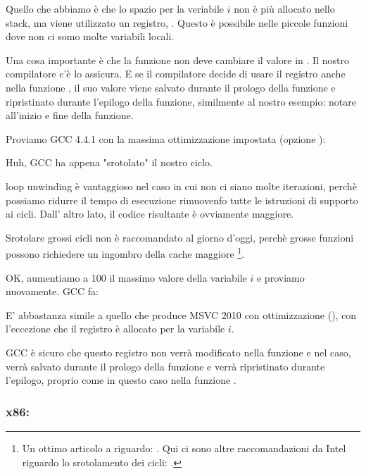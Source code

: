Quello che abbiamo è che lo spazio per la veriabile $i$ non è più allocato nello stack,
ma viene utilizzato un registro, \ESI.
Questo è possibile nelle piccole funzioni dove non ci somo molte variabili locali.

Una cosa importante è che la funzione \ttf non deve cambiare il valore in \ESI.
Il nostro compilatore c'è lo assicura. 
E se il compilatore decide di usare il registro \ESI anche nella funzione \ttf, il suo valore viene salvato durante il prologo della funzione e ripristinato durante l'epilogo della funzione,
similmente al nostro esempio: notare 
all'inizio e fine della funzione.

Proviamo GCC 4.4.1 con la massima ottimizzazione impostata (opzione \Othree):




Huh, GCC ha appena "srotolato" il nostro ciclo.

\Gls{loop unwinding} è vantaggioso nel caso in cui non ci siano molte iterazioni, perchè possiamo ridurre il tempo di esecuzione rimuovenfo tutte le istruzioni di supporto ai cicli. 
Dall' altro lato, il codice risultante è ovviamente maggiore.

Srotolare grossi cicli non è raccomandato al giorno d'oggi, perchè grosse funzioni possono richiedere un ingombro della cache maggiore%
%
\footnote{Un ottimo articolo a riguardo: \DrepperMemory.
Qui ci sono altre raccomandazioni da Intel riguardo lo srotolamento dei cicli: 
.}.

OK, aumentiamo a 100 il massimo valore della variabile $i$ e proviamo nuovamente. GCC fa:



E' abbastanza simile a quello che produce MSVC 2010 con ottimizzazione (\Ox), 
con l'eccezione che il registro \EBX è allocato per la variabile $i$.

GCC è sicuro che questo registro non verrà modificato nella funzione \ttf 
e nel caso, verrà salvato durante il prologo della funzione e verrà ripristinato durante l'epilogo, 
proprio come in questo caso nella funzione \main.

\clearpage
\subsubsection{x86: \olly}
\myindex{\olly}

